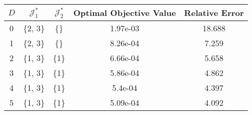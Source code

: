 \begin{subtable}{\textwidth}
\centering
\begin{tabular}{|c|c|c|c|c|}
  \hline
$D$ & $\mathcal J_1^*$ & $\mathcal J_2^*$ & Optimal Objective Value & Relative Error \\ 
  \hline
0 & \{2, 3\} & \{\} & 1.97e-03 & 18.688 \\ 
  1 & \{2, 3\} & \{\} & 8.26e-04 & 7.259 \\ 
  2 & \{1, 3\} & \{1\} & 6.66e-04 & 5.658 \\ 
  3 & \{1, 3\} & \{1\} & 5.86e-04 & 4.862 \\ 
  4 & \{1, 3\} & \{1\} & 5.4e-04 & 4.397 \\ 
  5 & \{1, 3\} & \{1\} & 5.09e-04 & 4.092 \\ 
   \hline
\end{tabular}
\end{subtable}
